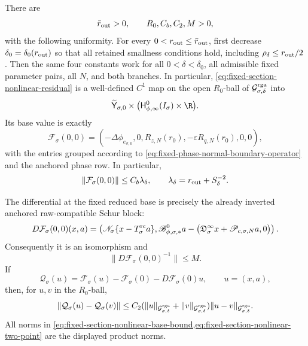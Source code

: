 \begin{theorem}
There are
\[
 \bar r_{\rm out}>0,
 \qquad R_0,C_b,C_2,M>0,
\]
with the following uniformity.  For every
\(0<r_{\rm out}\le\bar r_{\rm out}\), first decrease
\(\delta_0=\delta_0(r_{\rm out})\) so that all retained smallness
conditions hold, including
\(\rho_\delta\le r_{\rm out}/2\).  Then the same four constants work for
all \(0<\delta<\delta_0\), all admissible fixed parameter pairs, all
\(N\), and both branches.  In particular,
\cref{eq:fixed-section-nonlinear-residual} is a well-defined \(C^1\) map
on the open \(R_0\)-ball of
\(\mathcal G_{\sigma,\delta}^{\rm rga}\) into
\[
 \widetilde{\mathsf Y}_{\sigma,0}
    \times\bigl(\mathsf H_{\phi,\infty}^0(I_\sigma)\times\R\bigr).
\]
Its base value is exactly
\begin{equation}
 \mathcal F_\sigma(0,0)
 =\left(
  -\Delta\phi_{e_{\sigma,0}},0,
       R_{z,N}(r_0),-\varepsilon R_{q,N}(r_0),0,0
        \right),                                 \label{eq:fixed-section-nonlinear-base-residual}
\end{equation}
with the entries grouped according to
\cref{eq:fixed-phase-normal-boundary-operator} and the anchored phase row.
In particular,
\begin{equation}
 \|\mathcal F_\sigma(0,0)\|
 \le C_b\lambda_\delta,
 \qquad
 \lambda_\delta=r_{\rm out}+S_\delta^{-2}.      \label{eq:fixed-section-nonlinear-base-bound}
\end{equation}

The differential at the fixed reduced base is precisely the already
inverted anchored raw-compatible Schur block:
\begin{equation}
 D\mathcal F_\sigma(0,0)(x,a)
 =\left(
   \mathscr N_\sigma\{x-T_\sigma^{\rm rc}a\},
   \mathscr B_{\phi,\sigma,*}^0a
      -\bigl(\mathfrak D_\sigma^\infty x
                  +\mathscr P_{c,\sigma,N}a,0\bigr)
       \right).                                  \label{eq:fixed-section-nonlinear-linearization}
\end{equation}
Consequently it is an isomorphism and
\begin{equation}
 \|D\mathcal F_\sigma(0,0)^{-1}\|\le M.          \label{eq:fixed-section-linear-inverse-bound}
\end{equation}
If
\begin{equation}
 \mathcal Q_\sigma(u)
 =\mathcal F_\sigma(u)-\mathcal F_\sigma(0)
                      -D\mathcal F_\sigma(0)u,
 \qquad u=(x,a),                                 \label{eq:fixed-section-nonlinear-remainder}
\end{equation}
then, for \(u,v\) in the \(R_0\)-ball,
\begin{equation}
 \|\mathcal Q_\sigma(u)-\mathcal Q_\sigma(v)\|
 \le C_2(\|u\|_{\mathcal G_{\sigma,\delta}^{\rm rga}}
          +\|v\|_{\mathcal G_{\sigma,\delta}^{\rm rga}})
       \|u-v\|_{\mathcal G_{\sigma,\delta}^{\rm rga}}.  \label{eq:fixed-section-nonlinear-two-point}
\end{equation}
All norms in
\cref{eq:fixed-section-nonlinear-base-bound,eq:fixed-section-nonlinear-two-point}
are the displayed product norms.


\end{theorem}
